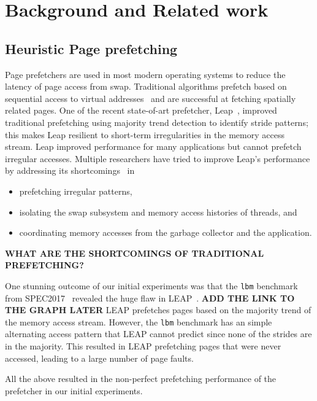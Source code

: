 \section{Background and Related work}\label{sec:2}

\subsection{Heuristic Page prefetching}
Page prefetchers are used in most modern operating systems to reduce the latency of page access from swap. 
Traditional algorithms prefetch based on sequential access to virtual addresses~\cite{vma-readahead, vm_fault_readahead} and are successful at fetching spatially related pages. 
One of the recent state-of-art prefetcher, Leap~\cite{leap}, improved traditional prefetching using majority trend detection to identify stride patterns; this makes Leap resilient to short-term irregularities in the memory access stream.
Leap improved performance for many applications but cannot prefetch irregular accesses. 
Multiple researchers have tried to improve Leap's performance by addressing its shortcomings~\cite{canvas, dilos, memliner} in \begin{itemize}
    \item prefetching irregular patterns,
    \item isolating the swap subsystem and memory access histories of threads, and
    \item coordinating memory accesses from the garbage collector and the application.
\end{itemize}

\textbf{WHAT ARE THE SHORTCOMINGS OF TRADITIONAL PREFETCHING?}

One stunning outcome of our initial experiments was that the \texttt{lbm} benchmark from SPEC2017~\cite{SPEC2017} revealed the huge flaw in LEAP~\cite{leap}. \textbf{ADD THE LINK TO THE GRAPH LATER} LEAP prefetches pages based on the majority trend of the memory access stream. However, the \texttt{lbm} benchmark has an simple alternating access pattern that LEAP cannot predict since none of the strides are in the majority. This resulted in LEAP prefetching pages that were never accessed, leading to a large number of page faults. 

All the above resulted in the non-perfect prefetching performance of the prefetcher in our initial experiments.


